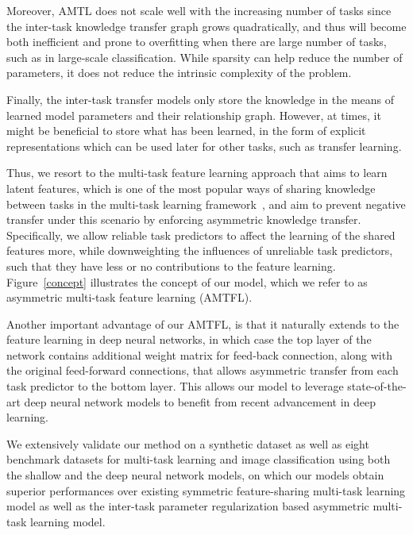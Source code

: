 \documentclass{article}
\begin{document}
	Moreover, AMTL does not scale well with the increasing number of tasks since the inter-task knowledge transfer graph grows quadratically, and thus will become both inefficient and prone to overfitting when there are large number of tasks, such as in large-scale classification. While sparsity can help reduce the number of parameters, it does not reduce the intrinsic complexity of the problem.
	
	Finally, the inter-task transfer models only store the knowledge in the means of learned model parameters and their relationship graph. However, at times, it might be beneficial to store what has been learned, in the form of explicit representations which can be used later for other tasks, such as transfer learning. 
	
	Thus, we resort to the multi-task feature learning approach that aims to learn latent features, which is one of the most popular ways of sharing knowledge between tasks in the multi-task learning framework~\cite{argyriou08,go-mtl}, and aim to prevent negative transfer under this scenario by enforcing asymmetric knowledge transfer. Specifically, we allow reliable task predictors to affect the learning of the shared features more, while downweighting the influences of unreliable task predictors, such that they have less or no contributions to the feature learning. Figure~\ref{concept} illustrates the concept of our model, which we refer to as asymmetric multi-task feature learning (AMTFL). 
	
	Another important advantage of our AMTFL, is that it naturally extends to the feature learning in deep neural networks, in which case the top layer of the network contains additional weight matrix for feed-back connection, along with the original feed-forward connections, that allows asymmetric transfer from each task predictor to the bottom layer. This allows our model to leverage state-of-the-art deep neural network models to benefit from recent advancement in deep learning.
	
	We extensively validate our method on a synthetic dataset as well as eight benchmark datasets for multi-task learning and image classification using both the shallow and the deep neural network models, on which our models obtain superior performances over existing symmetric feature-sharing multi-task learning model as well as the inter-task parameter regularization based asymmetric multi-task learning model. 
	
\end{document}
